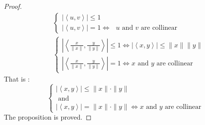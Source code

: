 \begin{proof}
\begin{align*}
&\begin{cases}
 \left| \left\langle u,v \right\rangle  \right| \leq  1
 \\
 \left| \left\langle u,v \right\rangle  \right| = 1 \iff 
 \text{ $u $ and $v $ are collinear }  
\end{cases}
\\
  &\begin{cases}
  \left| \left\langle \frac{x}{\| x \| }, 
  \frac{y}{\| y \| }\right\rangle  \right| \leq 1 
  \iff  \left| \left\langle x,y \right\rangle  \right| \leq 
  \| x \| \| y \|  \\
  \left| \left\langle \frac{x}{\| x \| }, 
  \frac{y}{\| y \| }\right\rangle  \right| = 1  
  \iff x \text{ and } y \text{ are collinear } 
  \end{cases}
\end{align*} 
That is : 
\[
\begin{cases}
  \left| \left\langle x,y \right\rangle  \right| \leq 
  \| x \| \cdot  \| y \|  \\
  \text{           and } 

  \\
  \left| \left\langle x,y \right\rangle  \right| = 
  \| x \|  \cdot  \| y \|  \iff 
  x \text{ and } y \text{ are collinear } 
\end{cases}
\]
The proposition is proved.
\end{proof}

